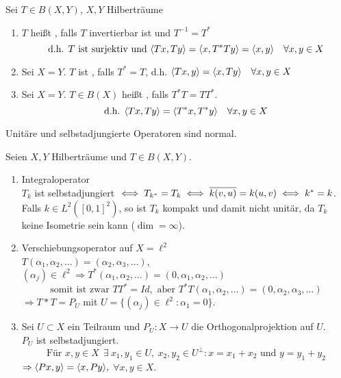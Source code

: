 \begin{definition}
	Sei $T \in B(X, Y)$, $X, Y$ Hilberträume
	\begin{enumerate}[label=\alph*\upshape)]
		\item $T$ hei{\ss}t , falls $T$ invertierbar ist und $T^{-1} = T^{*}$
			\[ \text{d.h. } T \text{ ist surjektiv und } \langle Tx , Ty \rangle = \langle x , T^{*} T y \rangle = \langle x , y \rangle \quad \forall x, y \in X \]
		\item Sei $X = Y$. $T$ ist , falls $T^{*} = T$, d.h. $\langle Tx , y \rangle = \langle x , T y \rangle \quad \forall x, y \in X$
		\item Sei $X = Y$. $T \in B(X)$ hei{\ss}t , falls $T^{*} T = T T^{*}$.
			\[ \text{d.h. } \langle Tx , Ty \rangle = \langle T^{*} x , T^{*} y \rangle \quad \forall x, y \in X \]
	\end{enumerate}
\end{definition}


\begin{bemerkung*}
	Unitäre und selbstadjungierte Operatoren sind normal.	
\end{bemerkung*}


\begin{beispiel}
	Seien $X, Y$ Hilberträume und $T \in B(X, Y)$.
	\begin{enumerate}[label=\alph*\upshape)]
		\item Integraloperator \\
			$T_{k}$	ist selbstadjungiert $\iff T_{k^{*}} = T_{k} \iff \overline{k(v, u)} = k(u, v) \iff k^{*} = k$. \\
			Falls $k \in L^{2}\left([0, 1]^{2}\right)$, so ist $T_{k}$ kompakt und damit nicht unitär, da $T_{k}$ keine Isometrie sein kann ($\dim = \infty$).
		\item Verschiebungsoperator auf $X = \ell^{2}$ \\
			$T(\alpha_{1}, \alpha_{2}, \dotsc ) = (\alpha_{2}, \alpha_{3}, \dotsc )$, $(\alpha_{j}) \in \ell^{2} \Rightarrow T^{*}(\alpha_{1}, \alpha_{2}, \dotsc ) = (0, \alpha_{1}, \alpha_{2}, \dotsc )$ \\
			\[ \text{somit ist zwar } T T^{*} = Id, \text { aber } T^{*} T (\alpha_{1}, \alpha_{2}, \dotsc ) = (0, \alpha_{2}, \alpha_{3}, \dotsc ) \]
			$\Rightarrow T* T = P_{U}$ mit $U = \{ (\alpha_{j}) \in \ell^{2} \colon \alpha_{1} = 0 \}$.
		\item Sei $U \subset X$ ein Teilraum und $P_{U} \colon X \rightarrow U$ die Orthogonalprojektion auf $U$. \\
			$P_{U}$ ist selbstadjungiert.
			\[ \text{Für } x, y \in X ~ ~ \exists ~ x_{1}, y_{1} \in U, ~ x_{2}, y_{2} \in U^{\bot}: x = x_{1} + x_{2} \text{ und } y = y_{1} + y_{2} \]
			$\Rightarrow \langle P x , y \rangle = \langle x , P y \rangle,$ $\forall x,y \in X$.
	\end{enumerate}
\end{beispiel}



